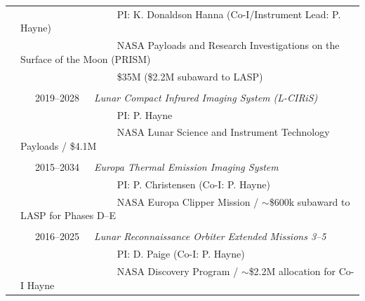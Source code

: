 \documentclass[letterpaper,10pt,twoside]{article}
\begin{document}
\begin{tabular}{@{} l l}
 & ~~~~~~~~~~~~~~~~ ~~~PI: K. Donaldson Hanna (Co-I/Instrument Lead: P. Hayne) \\
 & ~~~~~~~~~~~~~~~~ ~~~NASA Payloads and Research Investigations on the Surface of the Moon (PRISM) \\
 & ~~~~~~~~~~~~~~~~ ~~~\$35M (\$2.2M subaward to LASP) \\
  & \\
 & ~~~2019--2028~~~\textit{Lunar Compact Infrared Imaging System (L-CIRiS)} \\
 & ~~~~~~~~~~~~~~~~ ~~~PI: P. Hayne \\
 & ~~~~~~~~~~~~~~~~ ~~~NASA Lunar Science and Instrument Technology Payloads / \$4.1M \\
  & \\
 & ~~~2015--2034~~~\textit{Europa Thermal Emission Imaging System} \\
 & ~~~~~~~~~~~~~~~~ ~~~PI: P. Christensen (Co-I: P. Hayne) \\
 & ~~~~~~~~~~~~~~~~ ~~~NASA Europa Clipper Mission / $\sim$\$600k subaward to LASP for Phases D--E\\
 & \\
 & ~~~2016--2025~~~\textit{Lunar Reconnaissance Orbiter Extended Missions 3--5} \\
 & ~~~~~~~~~~~~~~~~ ~~~PI: D. Paige (Co-I: P. Hayne) \\
 & ~~~~~~~~~~~~~~~~ ~~~NASA Discovery Program / $\sim$\$2.2M allocation for Co-I Hayne \\
\end{tabular}
\end{document}

